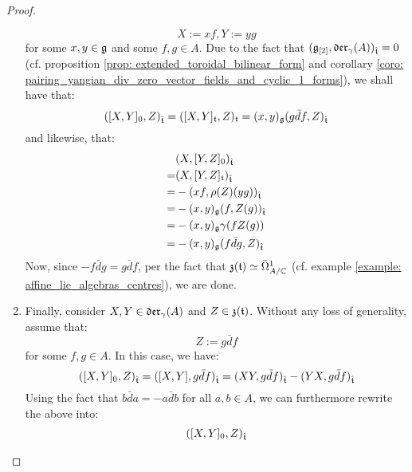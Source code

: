 \begin{proof}
\begin{enumerate}
                        $$X := xf, Y := yg$$
                    for some $x, y \in \g$ and some $f, g \in A$. Due to the fact that $(\g_{[2]}, \divzero)_{\extendedtoroidal} = 0$ (cf. proposition \ref{prop: extended_toroidal_bilinear_form} and corollary \ref{coro: pairing_yangian_div_zero_vector_fields_and_cyclic_1_forms}), we shall have that:
                        $$( [X, Y]_0, Z )_{\extendedtoroidal} = ( [X, Y]_{\toroidal}, Z )_{\toroidal} = (x, y)_{\g} ( g \bar{d}f, Z )_{\extendedtoroidal}$$
                    and likewise, that:
                        $$
                            \begin{aligned}
                                & ( X, [Y, Z]_0 )_{\extendedtoroidal}
                                \\
                                = & ( X, [Y, Z]_{\toroidal} )_{\extendedtoroidal}
                                \\
                                = & -( xf, \rho(Z)(yg))_{\extendedtoroidal}
                                \\
                                = & -(x, y)_{\g} (f, Z(g))_{\extendedtoroidal}
                                \\
                                = & -(x, y)_{\g} \gamma(f Z(g))
                                \\
                                = & -(x, y)_{\g} (f \bar{d}g, Z)_{\extendedtoroidal}
                            \end{aligned}
                        $$
                    Now, since $-f \bar{d}g = g\bar{d}f$, per the fact that $\z(\toroidal) \cong \bar{\Omega}^1_{A/\bbC}$ (cf. example \ref{example: affine_lie_algebras_centres}), we are done. 
                    \item Finally, consider $X, Y \in \divzero$ and $Z \in \z(\toroidal)$. Without any loss of generality, assume that:
                        $$Z := g\bar{d}f$$
                    for some $f, g \in A$. In this case, we have:
                        $$( [X, Y]_0, Z )_{\extendedtoroidal} = ( [X, Y], g\bar{d}f )_{\extendedtoroidal} = ( XY, g\bar{d}f )_{\extendedtoroidal} - ( YX, g\bar{d}f )_{\extendedtoroidal}$$
                    Using the fact that $b\bar{d}a = -a\bar{d}b$ for all $a, b \in A$, we can furthermore rewrite the above into:
                        $$
                            \begin{aligned}
                                & ( [X, Y]_0, Z )_{\extendedtoroidal}
                                \\

\end{aligned}$$
\end{enumerate}
\end{proof}
